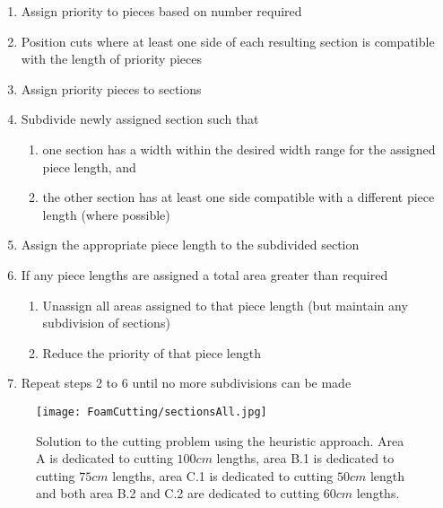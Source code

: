 \documentclass[10pt,a4paper]{article}
\begin{document}
\begin{enumerate}
\item Assign priority to pieces based on number required
\item Position cuts where at least one side of each resulting section is compatible with the length of priority pieces
\item Assign priority pieces to sections
\item Subdivide newly assigned section such that
\begin{enumerate} \item one section has a width within the desired width range for the assigned piece length, and\item the other section  has at least one side compatible with a different piece length (where possible)
\end{enumerate}
\item Assign the appropriate piece length to the subdivided section
\item If any piece lengths are assigned a total area greater than required
\begin{enumerate}
\item Unassign all areas assigned to that piece length (but maintain any subdivision of sections)
\item Reduce the priority of that piece length
\end{enumerate}
\item Repeat steps 2 to 6 until no more subdivisions can be made
\end{enumerate}

\begin{figure}
\centering
\texttt{[image: FoamCutting/sectionsAll.jpg]} 
\caption{Solution to the cutting problem using the heuristic approach. Area A is dedicated to cutting $100cm$ lengths, area B.1 is dedicated to cutting $75cm$ lengths, area C.1 is dedicated to cutting $50cm$ length and both area B.2 and C.2 are dedicated to cutting $60cm$ lengths.}
\label{fig:heursol}
\end{figure}
\end{document}
